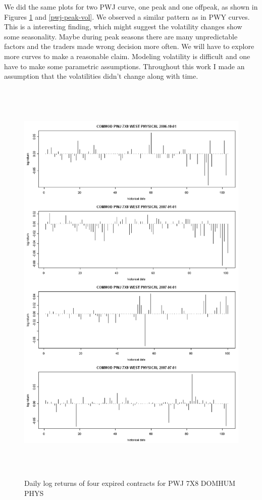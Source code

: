 We did the same plots for two PWJ curve, one peak and one offpeak,
as shown in Figures \ref{pwj-offpeak-vol} and \ref{pwj-peak-vol}.
We observed a similar pattern as in PWY curves. This is a interesting 
finding, which might suggest the volatility changes show some 
seasonality. Maybe during peak seasons there are many unpredictable
factors and the traders made wrong decision more often. 
We will have to explore more curves to make a reasonable claim.
Modeling volatility is difficult and one have to make some 
parametric assumptions. Throughout this work I made an assumption that
the volatilities didn't change along with time.
\begin{figure}[htbp]
\centering
\includegraphics[width=6in, height=8in]{figures/pwj-offpeak-vol.png}
\caption{Daily log returns of four expired contracts for PWJ 7X8 DOMHUM PHYS}
\label{pwj-offpeak-vol}
\end{figure}

